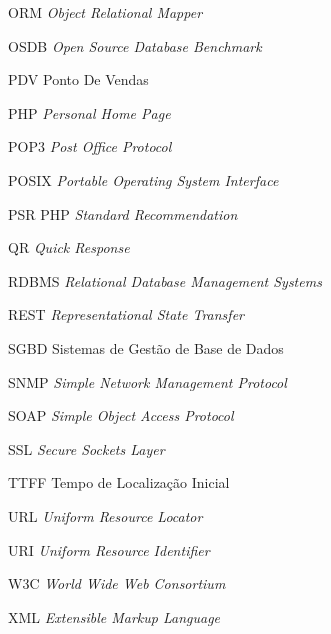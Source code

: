 \begin{siglas}
    \item[ORM] \textit{Object Relational Mapper}
    \item[OSDB] \textit{Open Source Database Benchmark}
    \item[PDV] Ponto De Vendas
    \item[PHP] \textit{Personal Home Page}
    \item[POP3] \textit{Post Office Protocol}
    \item[POSIX] \textit{Portable Operating System Interface}
    \item[PSR] PHP \textit{Standard Recommendation}
    \item[QR] \textit{Quick Response}
    \item[RDBMS] \textit{Relational Database Management Systems}
    \item[REST] \textit{Representational State Transfer}
    \item[SGBD] Sistemas de Gestão de Base de Dados
    \item[SNMP] \textit{Simple Network Management Protocol}
    \item[SOAP] \textit{Simple Object Access Protocol}
    \item[SSL] \textit{Secure Sockets Layer}
    \item[TTFF] Tempo de Localização Inicial
    \item[URL] \textit{Uniform Resource Locator}
    \item[URI] \textit{Uniform Resource Identifier}
    \item[W3C] \textit{World Wide Web Consortium}
    \item[XML] \textit{Extensible Markup Language}
\end{siglas}


